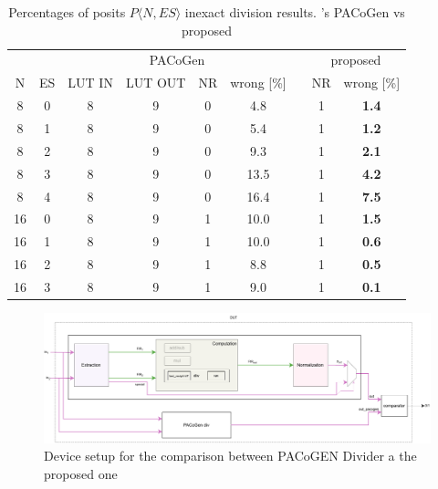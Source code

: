 \begin{table}
\begin{center}
\begin{savenotes}
\begin{tabular}{ccccccccc}
    \toprule
     & & \multicolumn{4}{c}{PACoGen} & & \multicolumn{2}{c}{proposed} \\
    \cmidrule{3-6} \cmidrule{8-9}
    N & ES & LUT IN & LUT OUT & NR & wrong [\%] & & NR & wrong [\%] \\
    \midrule \midrule
    8 & 0 & 8 & 9 & 0 & 4.8 & & 1 & \textbf{1.4} \\
    8 & 1 & 8 & 9 & 0 & 5.4 & & 1 & \textbf{1.2} \\
    8 & 2 & 8 & 9 & 0 & 9.3 & & 1 & \textbf{2.1} \\
    8 & 3 & 8 & 9 & 0 & 13.5 & & 1 & \textbf{4.2} \\
    8 & 4 & 8 & 9 & 0 & 16.4 & & 1 & \textbf{7.5} \\
    \midrule
    16 & 0 & 8 & 9 & 1 & 10.0 & & 1 & \textbf{1.5} \\
    16 & 1 & 8 & 9 & 1 & 10.0 & & 1 & \textbf{0.6} \\
    16 & 2 & 8 & 9 & 1 & 8.8 & & 1 & \textbf{0.5} \\
    16 & 3 & 8 & 9 & 1 & 9.0 & & 1 & \textbf{0.1} \\
    \bottomrule
\end{tabular}
\end{savenotes}
\caption{Percentages of posits $P\langle N,ES\rangle$ inexact division results. \cite{PACoGen}'s PACoGen vs proposed}
\label{table:comparison_div_against_pacogen_table}
\end{center}
\end{table}


\begin{figure}
        \includegraphics[width=\textwidth]{figures/pacogen_vs_me_dut.pdf}
        \caption{Device setup for the comparison between PACoGEN Divider a the proposed one}
        \label{fig:comparison_against_pacogogen_dut}
\end{figure}